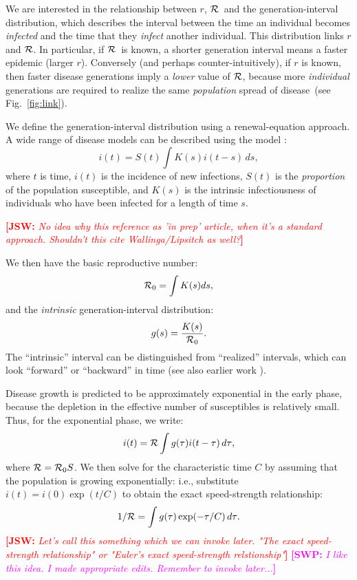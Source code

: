 \documentclass[12pt]{article}
\newcommand{\RR}{\ensuremath{{\cal R}}}
\newcommand{\Rx}[1]{\ensuremath{{\cal R}_{#1}}}
\newcommand{\Ro}{\Rx{0}}
\newcommand{\Tc}{\ensuremath{C}}
\newcommand{\fref}[1]{Fig.~\ref{fig:#1}}
\newcommand{\comment}[3]{\textcolor{#1}{\textbf{[#2: }\textit{#3}\textbf{]}}}
\newcommand{\swp}[1]{\comment{magenta}{SWP}{#1}}
\newcommand{\jsw}[1]{\comment{red}{JSW}{#1}}
\begin{document}
We are interested in the relationship between $r$, \RR~and the generation-interval distribution, which describes the interval between the time an individual becomes \emph{infected} and the time that they \emph{infect} another individual.
This distribution links $r$ and \RR. In particular, if \RR~is known, a shorter generation interval means a faster epidemic (larger $r$). Conversely (and perhaps counter-intuitively), if $r$ is known, then faster disease generations imply a \emph{lower} value of \RR, because more \emph{individual} generations are required to realize the same \emph{population} spread of disease~(see \fref{link}).

We define the generation-interval distribution using a renewal-equation approach.
A wide range of disease models can be described using the model 
\cite{Hees,ChampInPrep}:
\begin{equation}
i(t) = S(t)\int{K(s)i(t-s) \,ds},
\label{eq:Renewal}
\end{equation}
where $t$ is time, $i(t)$ is the incidence of new infections, $S(t)$ is the \emph{proportion} of the population susceptible, and $K(s)$ is the intrinsic infectiousness of individuals who have been infected for a length of time $s$.

\jsw{No idea why this reference as 'in prep' article, when it's a standard approach. Shouldn't this cite Wallinga/Lipsitch as well?}

We then have the basic reproductive number: 
\begin{equation}
\Ro = \int{K(s)ds},
\end{equation}
and the \emph{intrinsic} generation-interval distribution:
\begin{equation}
g(s) = \frac{K(s)}{\Ro}.
\end{equation}
The ``intrinsic'' interval can be distinguished from ``realized'' intervals, which can look ``forward'' or ``backward'' in time \cite{ChamDush15} (see also earlier work \cite{Sven07,Nish10}).

Disease growth is predicted to be approximately exponential in the early phase, because the depletion in the effective number of susceptibles is relatively small.
Thus, for the exponential phase, we write:
\begin{equation}
i(t) = \RR\int{g(\tau)i(t-\tau) \,d\tau},
\end{equation}
where $\RR = \Ro S$.
We then solve for the characteristic time $\Tc$ by assuming that the population is growing exponentially: i.e., substitute $i(t) = i(0) \exp(t/\Tc)$ to obtain the exact speed-strength relationship:
\begin{equation}
	1/\RR = \int{g(\tau)\exp(-\tau/\Tc) \,d\tau}.\label{eq:Euler}
\end{equation}
\jsw{Let's call this something which we can invoke later. "The exact speed-strength relationship" or "Euler's exact speed-strength relstionship"}
\swp{I like this idea. I made appropriate edits. Remember to invoke later...}
\end{document}
